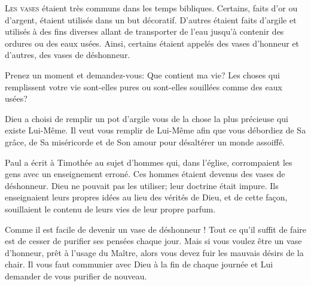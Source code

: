 
\lettrine{L}{es vases} étaient très communs dans les temps bibliques.
 Certains, faits d'or ou d'argent, étaient utilisés dans un but décoratif.
 D'autres étaient faits d'argile et utilisés à des fins diverses
 allant de transporter de l'eau jusqu'à contenir des ordures
 ou des eaux usées. Ainsi, certains étaient appelés des vases d'honneur
 et d'autres, des vases de déshonneur.

Prenez un moment et demandez-vous: 
 \Og Que contient ma vie? \Fg {}
 Les choses qui remplissent votre vie sont-elles
 pures ou sont-elles souillées comme des eaux usées? 


Dieu a choisi de remplir un pot d'argile \ocadr vous \fcadr{}
 de la chose la plus précieuse qui existe \ocadr Lui-Même.
 Il veut vous remplir de Lui-Même afin que vous débordiez de Sa grâce,
 de Sa miséricorde et de Son amour pour désaltérer un monde assoiffé.

Paul a écrit à Timothée au sujet d'hommes qui, dans l'église,
 corrompaient les gens avec un enseignement erroné.
 Ces hommes étaient devenus des vases de déshonneur.
 Dieu ne pouvait pas les utiliser; leur doctrine était impure.
 Ils enseignaient leurs propres idées au lieu des vérités de Dieu,
 et de cette fa\c{c}on, souillaient le contenu de leurs vies
 de leur propre parfum. 

Comme il est facile de devenir un vase de déshonneur !
 Tout ce qu'il suffit de faire est de cesser de purifier ses pensées
 chaque jour. Mais si vous voulez être un vase d'honneur,
 prêt à l'usage du Maître, alors vous devez fuir les mauvais désirs
 de la chair. Il vous faut communier avec Dieu à la fin de chaque journée
 et Lui demander de vous purifier de nouveau. 

\dvrule






